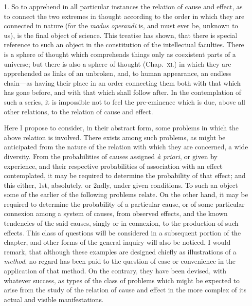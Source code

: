\documentclass[oneside]{book}
\begin{document}




1. So to apprehend in all particular instances the relation of
cause and effect, as to connect the two extremes in thought
according to the order in which they are connected in nature
(for the \textit{modus operandi} is, and must ever be, unknown to us),
is the final object of science. This treatise has shown, that there
is special reference to such an object in the constitution of the
intellectual faculties. There is a sphere of thought which comprehends things only as coexistent parts of a universe; but
there is also a sphere of thought (Chap.~\textsc{xi.}) in which they are
apprehended as links of an unbroken, and, to human appearance, an endless chain---as having their place in an order connecting them both with that which has gone before, and with
that which shall follow after. In the contemplation of such
a series, it is impossible not to feel the pre-eminence which is due,
above all other relations, to the relation of cause and effect.

Here I propose to consider, in their abstract form, some problems in which the above relation is involved. There exists
among such problems, as might be anticipated from the nature
of the relation with which they are concerned, a wide diversity.
From the probabilities of causes assigned \textit{\`{a} priori}, or given by
experience, and their respective probabilities of association with
an effect contemplated, it may be required to determine the probability of that effect; and this either, 1st, absolutely, or 2ndly,
under given conditions. To such an object some of the earlier
of the following problems relate. On the other hand, it may be
required to determine the probability of a particular cause, or of
some particular connexion among a system of causes, from observed effects, and the known tendencies of the said causes, singly
or in connexion, to the production of such effects. This class of
questions will be considered in a subsequent portion of the
chapter, and other forms of the general inquiry will also be
noticed. I would remark, that although these examples are designed chiefly as illustrations of a \emph{method}, no regard has been
paid to the question of ease or convenience in the application of
that method. On the contrary, they have been devised, with
whatever success, as types of the class of problems which might
be expected to arise from the study of the relation of cause and
effect in the more complex of its actual and visible manifestations.
\end{document}
